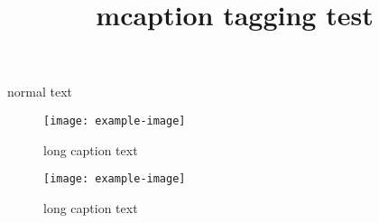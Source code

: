 \documentclass{article}
\title{mcaption tagging test}
\begin{document}
normal text

\begin{figure}
\begin{margincap}
\centering
\texttt{[image: example-image]}
\caption[short caption text]{long caption text}
\end{margincap}
\end{figure}

\begin{figure}
\centering
\texttt{[image: example-image]}
\caption[short caption text]{long caption text}
\end{figure}
\end{document}
